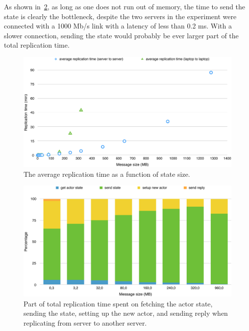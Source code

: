 \documentclass{cslthse-msc}
\begin{document}
As shown in~\cref{fig:replication_time_percentages_server}, as long as one does not run out of memory, the time to send the state is clearly the bottleneck, despite the two servers in the experiment were connected with a 1000 Mb/s link with a latency of less than 0.2 ms. With a slower connection, sending the state would probably be ever larger part of the total replication time.


\begin{figure}[!hbt]
\centering
\includegraphics[scale=0.5]{images/results/replication_time.pdf} 
\caption{The average replication time as a function of state size.}\label{fig:replication_time}
\end{figure}

\begin{figure}[!hbt]
\centering
\includegraphics[scale=0.5]{images/results/replication_time_percentages_server.pdf} 
\caption{Part of total replication time spent on fetching the actor state, sending the state, setting up the new actor, and sending reply when replicating from server to another server.}\label{fig:replication_time_percentages_server}
\end{figure}
\end{document}
